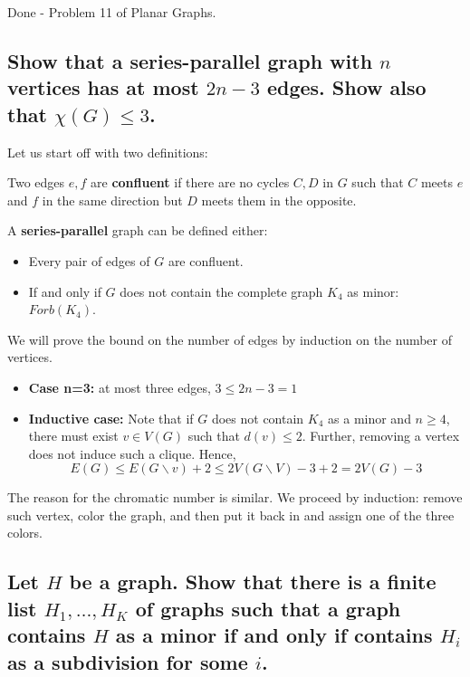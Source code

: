 Done - Problem 11 of Planar Graphs.

\subsection[Minors 1 - 3]{Show that a series-parallel graph with $n$ vertices has at most $2n -3$ edges. Show also that $\chi(G) \leq 3$.}

Let us start off with two definitions:
\begin{definition}
    Two edges $e,f$ are \textbf{confluent} if there are no cycles $C, D$ in $G$ such that $C$ meets $e$ and $f$ in the same direction but $D$ meets them in the opposite.
\end{definition}

\begin{definition}
    A \textbf{series-parallel} graph can be defined either:
    \begin{itemize}
        \item Every pair of edges of $G$ are confluent.
        \item If and only if $G$ does not contain the complete graph $K_4$ as minor: $Forb(K_4)$.
    \end{itemize}
\end{definition}

We will prove the bound on the number of edges by induction on the number of vertices.
\begin{itemize}
    \item \textbf{Case n=3:} at most three edges, $3 \leq 2n - 3 = 1$
    \item \textbf{Inductive case:}
        Note that if $G$ does not contain $K_4$ as a minor and $n \geq 4$, there must exist $v \in V(G)$ such that $d(v) \leq 2$.
        Further, removing a vertex does not induce such a clique.
        Hence,
        $$E(G) \leq E(G \backslash v) + 2 \leq 2 V(G \backslash V) -3 + 2 = 2V(G) -3$$
\end{itemize}

The reason for the chromatic number is similar.
We proceed by induction: remove such vertex, color the graph, and then put it back in and assign one of the three colors.

\subsection[Minors 1 - 5]{Let $H$ be a graph. Show that there is a finite list $H_1, \dots, H_K$ of graphs such that a graph contains $H$ as a minor if and only if contains $H_i$ as a subdivision for some $i$.}

